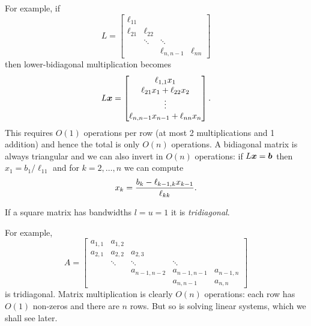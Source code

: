For example, if
\[
L = \begin{bmatrix}\ensuremath{\ell}_{11} \\
\ensuremath{\ell}_{21}& \ensuremath{\ell}_{22} \\ 
& \ensuremath{\ddots} & \ensuremath{\ddots} \\
 &&\ensuremath{\ell}_{n,n-1} &\ensuremath{\ell}_{nn}
\end{bmatrix}
\]
then lower-bidiagonal multiplication becomes
\[
L\bm{{\mbox{\boldmath$x$\unboldmath}}} = \begin{bmatrix} \ell_{1,1} x_1 \\ \ell_{21} x_1 + \ell_{22} x_2    \\ \vdots \\ 
\ell_{n,n-1} x_{n-1} + \ell_{nn} x_n \end{bmatrix}.
\]
This requires $O(1)$ operations per row (at most 2 multiplications and 1 addition) and hence the total is only $O(n)$ operations. A bidiagonal matrix is always triangular and we can also invert in $O(n)$ operations: if $L \bm{{\mbox{\boldmath$x$\unboldmath}}} = \bm{{\mbox{\boldmath$b$\unboldmath}}}$ then $x_1 = b_1/\ensuremath{\ell}_{11}$  and for $k = 2,\ensuremath{\ldots},n$ we can compute
\[
x_k = {b_k - \ensuremath{\ell}_{k-1,k} x_{k-1} \over \ensuremath{\ell}_{kk}}.
\]
\begin{definition}[Tridiagonal] If a square matrix has bandwidths $l = u = 1$ it is \emph{tridiagonal}. \end{definition}

For example,
\[
A = \begin{bmatrix} a_{1,1} & a_{1,2} \\
a_{2,1} & a_{2,2} & a_{2,3} \\
 & \ensuremath{\ddots} & \ensuremath{\ddots} & \ensuremath{\ddots} \\
&& a_{n-1,n-2} &                                 a_{n-1,n-1} & a_{n-1,n} \\
&&&a_{n,n-1} & a_{n,n}
\end{bmatrix}
\]
is tridiagonal. Matrix multiplication is clearly $O(n)$ operations: each row has $O(1)$ non-zeros and there are $n$ rows. But so is solving linear systems, which we shall see later.




